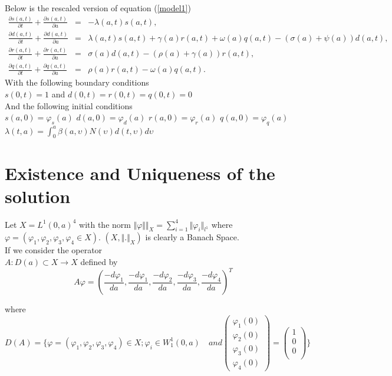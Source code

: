Below is the rescaled version of equation (\ref{model1})
 \begin{eqnarray}\label{model2}
\frac{\partial s(a,t)}{\partial t}+ \frac{\partial s(a,t)}{\partial a} & = &  -\lambda(a,t)s(a,t),\nonumber \\
\frac{\partial
d(a,t)}{\partial t} + \frac{\partial d(a,t)}{\partial a}& = &\lambda(a,t) s(a,t)+ \gamma(a) r(a,t) + \omega(a) q(a,t)-(\sigma(a)+\psi (a)) d(a,t), \nonumber \\
\frac{\partial r(a,t)}{\partial t} + \frac{\partial r(a,t)}{\partial a} &= &\sigma(a) d(a,t)-(\rho(a) +\gamma(a) )r(a,t),  \\
\frac{\partial q(a,t)}{\partial t}+\frac{\partial q(a,t)}{\partial a} & = &\rho(a) r(a,t)-\omega(a) q(a,t)\nonumber . 
\end{eqnarray}
 With the following boundary conditions \\
 
 $s(0,t) = 1$ and  $d(0,t) = r(0,t)=q(0,t)=0$ \\
 
 And the following initial conditions \\
 
 $s(a,0)=\varphi _{s} (a)$  $d(a,0)=\varphi _{d} (a)$  $r(a,0)=\varphi _{r} (a)$
 $q(a,0)=\varphi _{q} (a)$ \\
 
 $\lambda (t,a)= \int_{0}^{a} \beta (a,\upsilon)N(\upsilon) d (t,\upsilon) d \upsilon$\\
\section{Existence and Uniqueness of the solution } 
 Let $X=L^{1}(0,a) ^4$ with the norm $\Vert \varphi \Vert\Vert_X=\sum_{i=1}^{4} \Vert \varphi_i\Vert_{l^1}$ where $\varphi=(\varphi_1, \varphi_2, \varphi_3,\varphi_4 \in X )$.
 $(X,\Vert. \Vert_X)$ is clearly a Banach Space.\\
 
 If we consider the operator \\
 $A:D(a) \subset X \longrightarrow X$ defined by \\
 
 $$A \varphi = (\frac{-d \varphi_1}{da},\frac{-d \varphi_1}{da},\frac{-d \varphi_2}{da}, \frac{-d \varphi_3}{da}, \frac{-d \varphi_4}{da})^T$$  
 
 where $D(A)=\bigg\lbrace \varphi =(\varphi_1, \varphi_2, \varphi_3, \varphi_4) \in X; \varphi_i \in W_{1}^{1}(0,a)
\quad and  
\begin{pmatrix}
\varphi_{1} (0 )\\\varphi_{2} (0) \\ \varphi_{3} (0) \\ \varphi_{4} (0)
\end{pmatrix} =\begin{pmatrix}
1 \\ 0\\0\\
\end{pmatrix} \bigg\rbrace$


